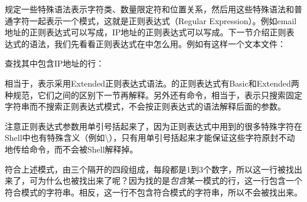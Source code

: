 规定一些特殊语法表示字符类、数量限定符和位置关系，然后用这些特殊语法和普通字符一起表示一个模式，这就是正则表达式（Regular Expression）。例如email地址的正则表达式可以写成，IP地址的正则表达式可以写成。下一节介绍正则表达式的语法，我们先看看正则表达式在中怎么用。例如有这样一个文本文件：




查找其中包含IP地址的行：




相当于，表示采用Extended正则表达式语法。的正则表达式有Basic和Extended两种规范，它们之间的区别下一节再解释。另外还有命令，相当于，表示只搜索固定字符串而不搜索正则表达式模式，不会按正则表达式的语法解释后面的参数。



注意正则表达式参数用单引号括起来了，因为正则表达式中用到的很多特殊字符在Shell中也有特殊含义（例如\textbackslash{}），只有用单引号括起来才能保证这些字符原封不动地传给命令，而不会被Shell解释掉。



符合上述模式，由三个隔开的四段组成，每段都是1到3个数字，所以这一行被找出来了，可为什么也被找出来了呢？因为找的是\emph{包含}某一模式的行，这一行包含一个符合模式的字符串。相反，这一行不包含符合模式的字符串，所以不会被找出来。



